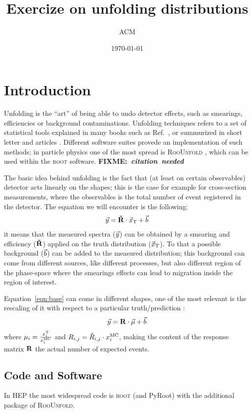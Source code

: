 \documentclass[a4paper,11pt]{article}
\title{Exercize on unfolding distributions}
\author{ACM}
\date{\today}
\newcommand{\meas} {\ensuremath \vec{y}}
\newcommand{\truth}{\ensuremath \vec{x}_\textup{T}}
\newcommand{\resp} {\ensuremath \mathbf{R}}
\newcommand{\back} {\ensuremath \vec{b}}
\newcommand{\respt}{\ensuremath \mathbf{\tilde{R}}}
\newcommand{\strength}{\ensuremath \vec{\mu} }
\newcommand{\truthI}[1]{\ensuremath x^\textup{T}_{#1}}
\newcommand{\strengthI}[1]{\ensuremath \mu_{#1} }
\newcommand{\mcI}[1]{\ensuremath x^\textup{MC}_{#1}}
\newcommand{\respI}[2]{\ensuremath R_{#1,#2} }
\newcommand{\resptI}[2]{\ensuremath \tilde{R}_{#1,#2} }
\newcommand{\fixme}[1]{ \mbox{\bf{FIXME:} \it{#1}} }
\begin{document}
\maketitle
\section{Introduction}
Unfolding is the ``art'' of being able to undo detector effects, such as smearings, efficiencies or background contaminations.
Unfolding techniques refers to a set of statistical tools explained in many books such as Ref.~\cite{Cowan}, 
or summurized in short letter and articles \cite{Cowan:unfolding}. 
Different software suites provede an implementation of such methods; 
in particle physics one of the most spread is {\scshape RooUnfold} \cite{RooUnfold}, 
which can be used within the {\scshape root} software. \fixme{citation needed}

The basic idea behind unfolding is the fact that (at least on certain observables) detector acts linearly on the shapes; this is the case for example for cross-section measurements, where the observables is the total number of event registered in the detector.
The equation we will encounter is the following:
\begin{equation}
	\meas= \respt \cdot \truth + \back
	\label{eqn:base}
\end{equation}
it means that the measured spectra ($\meas$) can be obtained by a smearing and efficiency ($\respt$) applied on the truth distribution ($\truth$). To that a possible background ($\back$) can be added to the measured distribution; this background can come from different sources, like different processes, but also different region of the phase-space where the smearings effects can lead to migration inside the region of interest.

Equation~\ref{eqn:base} can come in different shapes, one of the most relevant is the rescaling of it with respect to a particular truth/prediction \cite{SVD}:
\begin{equation}
	\meas = \resp \cdot \strength + \back
\end{equation}
where $\strengthI{i} = \frac{\truthI{i}}{\mcI{i}} $ and  $\respI{i}{j} = \resptI{i}{j} \cdot \mcI{i} $, making the content of the response matrix $\resp$ the actual number of expected events.

\subsection{Code and Software}
In HEP the most widespread code is {\scshape root} (and {PyRoot}) with the additional package of {\scshape RooUnfold}.
\end{document}
